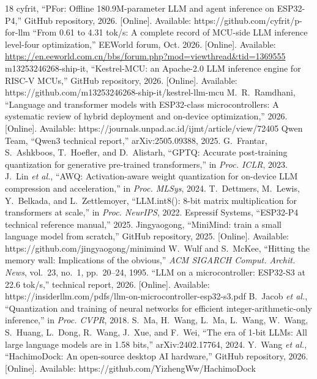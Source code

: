 \documentclass[journal,letterpaper]{IEEEtran}
\begin{document}
\begin{thebibliography}{18}
 cyfrit, ``PFor: Offline 180.9M-parameter LLM and agent inference on ESP32-P4,'' GitHub repository, 2026. [Online]. Available: https://github.com/cyfrit/p-for-llm
 ``From 0.61 to 4.31 tok/s: A complete record of MCU-side LLM inference level-four optimization,'' EEWorld forum, Oct. 2026. [Online]. Available: \url{https://en.eeworld.com.cn/bbs/forum.php?mod=viewthread&tid=1369555}
 m13253246268-ship-it, ``Kestrel-MCU: an Apache-2.0 LLM inference engine for RISC-V MCUs,'' GitHub repository, 2026. [Online]. Available: https://github.com/m13253246268-ship-it/kestrel-llm-mcu
 M.~R.~Ramdhani, ``Language and transformer models with ESP32-class microcontrollers: A systematic review of hybrid deployment and on-device optimization,'' 2026. [Online]. Available: https://journals.unpad.ac.id/ijmt/article/view/72405
 Qwen Team, ``Qwen3 technical report,'' arXiv:2505.09388, 2025.
 G.~Frantar, S.~Ashkboos, T.~Hoefler, and D.~Alistarh, ``GPTQ: Accurate post-training quantization for generative pre-trained transformers,'' in \emph{Proc. ICLR}, 2023.
 J.~Lin \emph{et al.}, ``AWQ: Activation-aware weight quantization for on-device LLM compression and acceleration,'' in \emph{Proc. MLSys}, 2024.
 T.~Dettmers, M.~Lewis, Y.~Belkada, and L.~Zettlemoyer, ``LLM.int8(): 8-bit matrix multiplication for transformers at scale,'' in \emph{Proc. NeurIPS}, 2022.
 Espressif Systems, ``ESP32-P4 technical reference manual,'' 2025.
 Jingyaogong, ``MiniMind: train a small language model from scratch,'' GitHub repository, 2025. [Online]. Available: https://github.com/jingyaogong/minimind
 W.~Wulf and S.~McKee, ``Hitting the memory wall: Implications of the obvious,'' \emph{ACM SIGARCH Comput. Archit. News}, vol.~23, no.~1, pp.~20--24, 1995.
 ``LLM on a microcontroller: ESP32-S3 at 22.6 tok/s,'' technical report, 2026. [Online]. Available: https://insiderllm.com/pdfs/llm-on-microcontroller-esp32-s3.pdf
 B.~Jacob \emph{et al.}, ``Quantization and training of neural networks for efficient integer-arithmetic-only inference,'' in \emph{Proc. CVPR}, 2018.
 S.~Ma, H.~Wang, L.~Ma, L.~Wang, W.~Wang, S.~Huang, L.~Dong, R.~Wang, J.~Xue, and F.~Wei, ``The era of 1-bit LLMs: All large language models are in 1.58 bits,'' arXiv:2402.17764, 2024.
 Y.~Wang \emph{et al.}, ``HachimoDock: An open-source desktop AI hardware,'' GitHub repository, 2026. [Online]. Available: https://github.com/YizhengWw/HachimoDock
\end{thebibliography}
\end{document}

